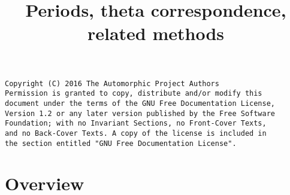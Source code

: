 

%

\newcommand{\TAG}{ZZZZ}

\title{Periods, theta correspondence, related methods}


\maketitle

\label{section-phantom}
\hypertarget{0500}{}
\reversemarginpar{}

\begin{verbatim}
Copyright (C) 2016 The Automorphic Project Authors
Permission is granted to copy, distribute and/or modify this
document under the terms of the GNU Free Documentation License,
Version 1.2 or any later version published by the Free Software
Foundation; with no Invariant Sections, no Front-Cover Texts,
and no Back-Cover Texts. A copy of the license is included in
the section entitled "GNU Free Documentation License".
\end{verbatim}

\tableofcontents


\section{Overview}
\label{section-overview}
\hypertarget{0501}{}
\reversemarginpar{}








